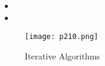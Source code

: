 \begin{itemize}
    \item 
    \item
\end{itemize}  


\begin{figure}[H]
    \centering
    \texttt{[image: p210.png]}
    \caption{Iterative Algorithms}
    \label{fig:p210}
\end{figure}